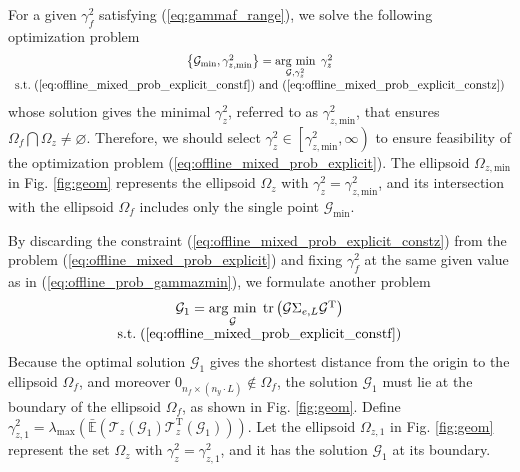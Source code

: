 \documentclass[twocolumn]{autart}
\DeclareMathOperator*{\argmin}{\arg\,\min}
\begin{document}
For a given $\gamma_f^2$ satisfying (\ref{eq:gammaf_range}), we solve the following optimization problem
\begin{equation}\label{eq:offline_prob_gammazmin}
\begin{array}{c}
\left\{ \mathcal{G}_{\rm{min}}, \gamma_{z,\rm{min}}^2 \right\} = \argmin\limits_{\mathcal{G}, \gamma_z^2}\; \gamma_z^2 \\
\mathrm{s.t.}\; (\ref{eq:offline_mixed_prob_explicit_constf}) \text{ and } (\ref{eq:offline_mixed_prob_explicit_constz}) \\
\end{array}
\end{equation}
whose solution gives the minimal $\gamma_z^2$, referred to as $\gamma_{z,\text{min}}^2$, that ensures $\Omega_f \bigcap \Omega_z \neq \varnothing$. Therefore, we should select $\gamma_z^2 \in \left[ \gamma_{z,\text{min}}^2, \infty \right)$ to ensure feasibility of the optimization problem (\ref{eq:offline_mixed_prob_explicit}).
The ellipsoid $\Omega_{z,\text{min}}$ in Fig. \ref{fig:geom} represents the ellipsoid $\Omega_z$ with $\gamma_z^2 = \gamma_{z,\text{min}}^2$, and its intersection with the ellipsoid $\Omega_f$ includes only the single point $\mathcal{G}_{\text{min}}$.


By discarding the constraint (\ref{eq:offline_mixed_prob_explicit_constz}) from the problem (\ref{eq:offline_mixed_prob_explicit}) and fixing $\gamma_f^2$ at the same given value as in (\ref{eq:offline_prob_gammazmin}), we formulate another problem
\begin{equation}\label{eq:offline_prob_gammazmax}
\begin{array}{c}
\mathcal{G}_1 = \argmin\limits_{\mathcal{G}}\; \mathrm{tr} \left( \mathcal{G} \Sigma_{e,L} \mathcal{G}^\mathrm{T} \right) \\
\mathrm{s.t.}\; (\ref{eq:offline_mixed_prob_explicit_constf}) 
\end{array}
\end{equation}
Because the optimal solution $\mathcal{G}_1$ gives the shortest distance from the origin to the ellipsoid $\Omega_f$, and moreover $0_{n_f \times \left(n_y \cdot L \right)} \notin \Omega_f$, the solution $\mathcal{G}_1$ must lie at the boundary of the ellipsoid $\Omega_f$, as shown in Fig. \ref{fig:geom}.
Define $\gamma_{z,1}^2 = \lambda_{\text{max}} \left(\mathbb{\bar E} \left( {\mathcal{T}}_{z} \left( \mathcal{G}_1 \right) {\mathcal{T}}_{z}^\mathrm{T} \left( \mathcal{G}_1 \right) \right)\right)$. Let the ellipsoid $\Omega_{z,1}$ in Fig. \ref{fig:geom} represent the set $\Omega_z$ with $\gamma_z^2 = \gamma_{z,1}^2$, and it has the solution  $\mathcal{G}_1$ at its boundary.
\end{document}
